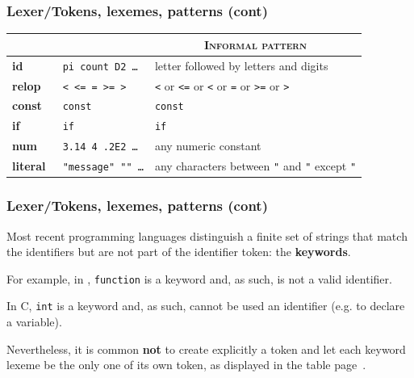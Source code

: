 %
\begin{frame}
\frametitle{Lexer/Tokens, lexemes, patterns (cont)}

\label{tokens_lexemes}

{\small
\begin{center}
\begin{tabular}{>{\bfseries\sffamily}l|>{\tt}l|l}
\hline\hline
  \multicolumn{1}{c|}{\textsc{Token}}
& \multicolumn{1}{c|}{\textsc{Sample lexemes}}
& \multicolumn{1}{c}{\textsc{Informal pattern}}\\
\hline
id       & pi count D2 \dots  & letter followed by letters and digits\\
relop    & < <= = >= >   & \texttt{<} or \texttt{<=} or \texttt{<} or \texttt{=} or \texttt{>=} or \texttt{>}\\
const    & const         & \texttt{const}\\
if       & if            & \texttt{if}\\
num      & 3.14 4 .2E2 \ldots  & any numeric constant\\
literal  & "message" ""  \ldots & any characters between \texttt{"} and \texttt{"} except \texttt{"}\\
\hline
\end{tabular}
\end{center}
}

\end{frame}

%
\begin{frame}
\frametitle{Lexer/Tokens, lexemes, patterns (cont)}

Most recent programming languages distinguish a finite set of strings
that match the identifiers but are not part of the identifier token:
the \textbf{keywords}.

\bigskip

For example, in \Ada, \texttt{function} is a keyword and, as such, is
not a valid identifier.

\bigskip

In C, \texttt{int} is a keyword and, as such, cannot be used an
identifier (e.g. to declare a variable).

\bigskip

Nevertheless, it is common \textbf{not} to create explicitly
a  token and let each keyword lexeme be the only
one of its own token, as displayed in the table
page~\pageref{tokens_lexemes}.

\end{frame}

